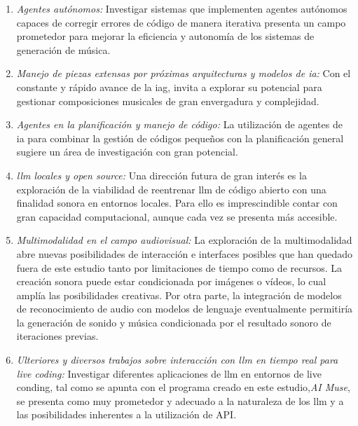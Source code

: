 \begin{enumerate}
\item \textit{Agentes autónomos:} Investigar sistemas que implementen agentes autónomos capaces de corregir errores de código de manera iterativa presenta un campo prometedor para mejorar la eficiencia y autonomía de los sistemas de generación de música.

\item \textit{Manejo de piezas extensas por próximas arquitecturas y modelos de \gls{ia}:} Con el constante y rápido avance de la \gls{iag},  invita a explorar su potencial para gestionar composiciones musicales de gran envergadura y complejidad.

\item \textit{Agentes en la planificación y manejo de código:} La utilización de agentes de \gls{ia} para combinar la gestión de códigos pequeños con la planificación general sugiere un área de investigación con gran potencial.

\item \textit{\gls{llm} locales y open source:} Una dirección futura de gran interés es la exploración de la viabilidad de reentrenar \gls{llm} de código abierto con una finalidad sonora en entornos locales. Para ello es imprescindible contar con gran capacidad computacional, aunque cada vez se presenta más accesible.

\item \textit{Multimodalidad en el campo audiovisual:} La exploración de la multimodalidad abre nuevas posibilidades de interacción e interfaces posibles que han quedado fuera de este estudio tanto por limitaciones de tiempo como de recursos. La creación sonora puede estar condicionada por imágenes o vídeos, lo cual amplía las posibilidades creativas. Por otra parte, la integración de modelos de reconocimiento de audio con modelos de lenguaje eventualmente permitiría la generación de sonido y música condicionada por el resultado sonoro de iteraciones previas.

\item \textit{Ulteriores y diversos trabajos sobre interacción con \gls{llm} en tiempo real para \emph{live coding}:} Investigar diferentes aplicaciones de \gls{llm} en entornos de live conding, tal como se apunta con el programa creado en este estudio,\emph{AI Muse}, se presenta como muy prometedor y adecuado a la naturaleza de los \gls{llm} y a las posibilidades inherentes a la utilización de API.

\end{enumerate}
